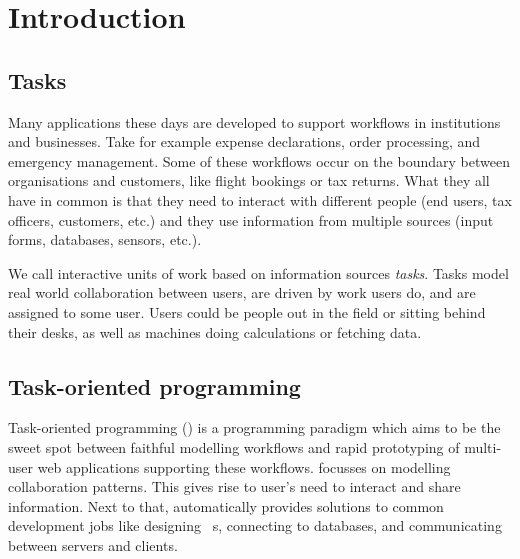 


\section{Introduction}


\subsection{Tasks}

Many applications these days are developed to support workflows in institutions and businesses.
Take for example expense declarations, order processing, and emergency management.
Some of these workflows occur on the boundary between organisations and customers,
like flight bookings or tax returns.
What they all have in common is
that they need to interact with different people (end users, tax officers, customers, etc.)
and they use information from multiple sources (input forms, databases, sensors, etc.).

We call interactive units of work based on information sources \emph{tasks}.
Tasks model real world collaboration between users,
are driven by work users do,
and are assigned to some user.
Users could be people out in the field or sitting behind their desks,
as well as machines doing calculations or fetching data.



\subsection{Task-oriented programming}

Task-oriented programming (\TOP) is a programming paradigm which aims to be the sweet spot between faithful modelling workflows
and rapid prototyping of multi-user web applications supporting these workflows.
\TOP focusses on modelling collaboration patterns.
This gives rise to user's need to interact and share information.
Next to that, \TOP automatically provides solutions to common development jobs like designing \GUI\ s, connecting to databases, and communicating between servers and clients.

